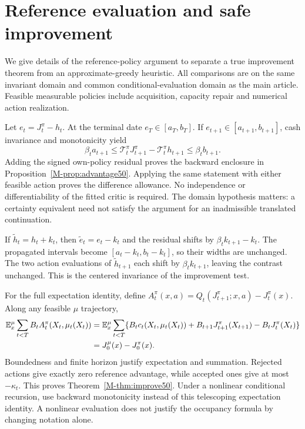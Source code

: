 \section{Reference evaluation and safe improvement}\label{supp:improve50}
We give details of the reference-policy argument to separate a true improvement theorem from an approximate-greedy heuristic. All comparisons are on the same invariant domain and common conditional-evaluation domain as the main article. Feasible measurable policies include acquisition, capacity repair and numerical action realization.

Let $e_t=J_t^\pi-h_t$. At the terminal date $e_T\in[a_T,b_T]$. If $e_{t+1}\in[a_{t+1},b_{t+1}]$, cash invariance and monotonicity yield
\[
 \beta_ta_{t+1}\le
 \mathcal T_t^\pi J_{t+1}^\pi-\mathcal T_t^\pi h_{t+1}
 \le\beta_tb_{t+1}.
\]
Adding the signed own-policy residual proves the backward enclosure in Proposition~\ref{M-prop:advantage50}. Applying the same statement with either feasible action proves the difference allowance. No independence or differentiability of the fitted critic is required. The domain hypothesis matters: a certainty equivalent need not satisfy the argument for an inadmissible translated continuation.

If $\widetilde h_t=h_t+k_t$, then $\widetilde e_t=e_t-k_t$ and the residual shifts by $\beta_tk_{t+1}-k_t$. The propagated intervals become $[a_t-k_t,b_t-k_t]$, so their widths are unchanged. The two action evaluations of $\widetilde h_{t+1}$ each shift by $\beta_tk_{t+1}$, leaving the contrast unchanged. This is the centered invariance of the improvement test.

For the full expectation identity, define
$A_t^\pi(x,a)=Q_t(J_{t+1}^\pi;x,a)-J_t^\pi(x)$. Along any feasible $\mu$ trajectory,
\begin{align*}
 \mathbb E_x^\mu\sum_{t<T}B_tA_t^\pi(X_t,\mu_t(X_t))
 &=\mathbb E_x^\mu\sum_{t<T}\{B_tc_t(X_t,\mu_t(X_t))
          +B_{t+1}J_{t+1}^\pi(X_{t+1})-B_tJ_t^\pi(X_t)\}\\
 &=J_0^\mu(x)-J_0^\pi(x).
\end{align*}
Boundedness and finite horizon justify expectation and summation. Rejected actions give exactly zero reference advantage, while accepted ones give at most $-\kappa_t$. This proves Theorem~\ref{M-thm:improve50}. Under a nonlinear conditional recursion, use backward monotonicity instead of this telescoping expectation identity. A nonlinear evaluation does not justify the occupancy formula by changing notation alone.

